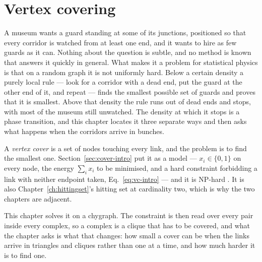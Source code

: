 \chapter{Vertex covering}
\label{ch:cover}

A museum wants a guard standing at some of its junctions, positioned so that
every corridor is watched from at least one end, and it wants to hire as few
guards as it can. Nothing about the question is subtle, and no method is known
that answers it quickly in general. What makes it a problem for statistical
physics is that on a random graph it is not uniformly hard. Below a certain
density a purely local rule --- look for a corridor with a dead end, put the
guard at the other end of it, and repeat --- finds the smallest possible set of
guards and proves that it is smallest. Above that density the rule runs out of
dead ends and stops, with most of the museum still unwatched. The density at
which it stops is a phase transition, and this chapter locates it three separate
ways and then asks what happens when the corridors arrive in bunches.

A \emph{vertex cover} is a set of nodes touching every link, and the problem is
to find the smallest one. Section~\ref{sec:cover-intro} put it as a model ---
$x_{i}\in\{0,1\}$ on every node, the energy $\sum_{i}x_{i}$ to be minimised, and
a hard constraint forbidding a link with neither endpoint taken,
Eq.~\eqref{eq:vc-intro} --- and it is NP-hard
\citep{karp1972}. It is also Chapter~\ref{ch:hittingset}'s hitting set at
cardinality two, which is why the two chapters are adjacent.

This chapter solves it on a chygraph. The constraint is then read over every
pair inside every complex, so a complex is a clique that has to be covered, and
what the chapter asks is what that changes: how small a cover can be when the
links arrive in triangles and cliques rather than one at a time, and how much
harder it is to find one.

